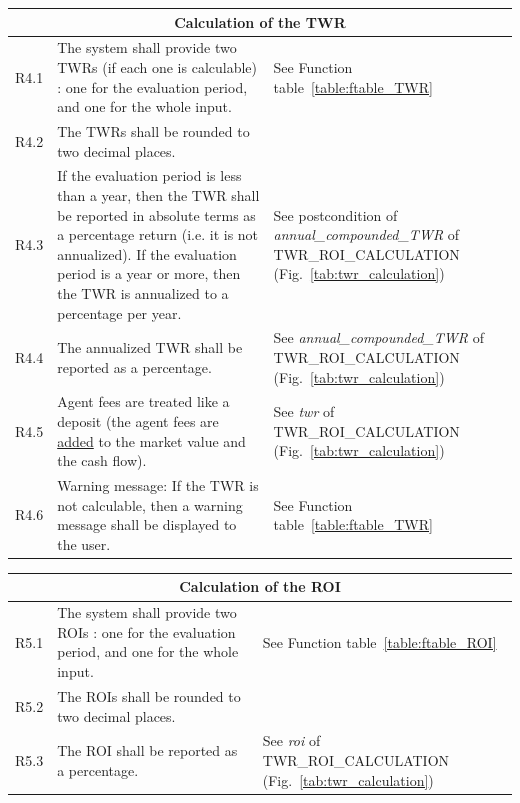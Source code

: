 \documentclass[runningheads,12pt]{article}
\begin{document}
{\begin{longtable}{|l|p{9cm}|p{5cm}|}
\hline
\multicolumn{3}{|c|}{\textbf{Calculation of the TWR}} \\

\hline
R4.1 & The system shall provide two TWRs (if each one is calculable) : one for the evaluation period, and one for the whole input. & See Function table~\ref{table:ftable_TWR} \\

\hline
R4.2 &  The TWRs shall be rounded to two decimal places. & \\

\hline
R4.3 & If the evaluation period is less than a year, then the TWR shall be reported in absolute terms as a percentage return (i.e. it is not annualized). If the evaluation period is a year or more, then the TWR is annualized to a percentage per year. & See postcondition of  \textit{annual\_compounded\_TWR} of TWR\_ROI\_CALCULATION (Fig.~\ref{tab:twr_calculation})\\

\hline
R4.4 & The annualized TWR shall be reported as a percentage. & See \textit{annual\_compounded\_TWR} of TWR\_ROI\_CALCULATION (Fig.~\ref{tab:twr_calculation})\\

\hline
R4.5 & Agent fees are treated like a deposit (the agent fees are \underline{added} to the market value and the cash flow). & See \textit{twr} of TWR\_ROI\_CALCULATION (Fig.~\ref{tab:twr_calculation})\\

\hline
R4.6 & Warning message: If the TWR is not calculable, then a warning message shall be displayed to the user. & See Function table~\ref{table:ftable_TWR}\\

\hline
\end{longtable}
\centering
\begin{longtable}{|l|p{9cm}|p{5cm}|}

\hline
\multicolumn{3}{|c|}{\textbf{Calculation of the ROI}} \\

\hline
R5.1 & The system shall provide two ROIs : one for the evaluation period, and one for the whole input. & See Function table~\ref{table:ftable_ROI}\\

\hline
R5.2 &  The ROIs shall be rounded to two decimal places. & \\

\hline
R5.3 & The ROI shall be reported as a percentage. & See \textit{roi} of TWR\_ROI\_CALCULATION (Fig.~\ref{tab:twr_calculation})\\


\end{longtable}}
\end{document}
